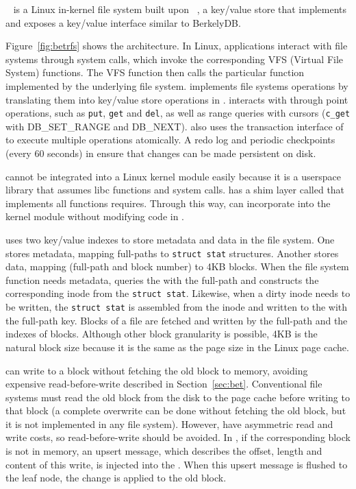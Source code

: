 \betrfs~\citep{betrfs1,betrfs1tos} is a Linux in-kernel file
system built upon \fti~\citep{fti}, a key/value store that implements \bets and
exposes a key/value interface similar to BerkelyDB.

Figure~\ref{fig:betrfs} shows the \betrfs architecture.
In Linux, applications interact with file systems through system calls,
which invoke the corresponding VFS (Virtual File System) functions.
The VFS function then calls the particular function implemented by
the underlying file system.
\betrfs implements file systems operations by translating them into key/value
store operations in \fti.
\betrfs interacts with \fti through point operations, such as \texttt{put},
\texttt{get} and \texttt{del}, as well as range queries with cursors
(\texttt{c\_get} with DB\_SET\_RANGE and DB\_NEXT).
\betrfs also uses the transaction interface of \fti to execute multiple
operations atomically.
A redo log and periodic checkpoints (every 60 seconds) in \fti ensure that
changes can be made persistent on disk.

\Fti cannot be integrated into a Linux kernel module easily because
it is a userspace library that assumes libc functions and system calls.
\betrfs has a shim layer called \klibc that implements all functions \fti
requires.
Through this way, \betrfs can incorporate \fti into the kernel module without
modifying code in \fti.

\betrfs uses two key/value indexes to store metadata and data in the file
system.
One \mdb stores metadata, mapping full-paths to \texttt{struct stat} structures.
Another \ddb stores data, mapping (full-path and block number) to 4KB blocks.
When the file system function needs metadata, \betrfs queries
the \mdb with the full-path and constructs the corresponding inode
from the \texttt{struct stat}.
Likewise, when a dirty inode needs to be written, the \texttt{struct stat} is
assembled from the inode and written to the \mdb with the
full-path key.
Blocks of a file are fetched and written by the full-path and the indexes of
blocks.
Although other block granularity is possible, 4KB is the natural block size
because it is the same as the page size in the Linux page cache.

\betrfs can write to a block without fetching the old block to memory, avoiding
expensive read-before-write described in Section~\ref{sec:bet}.
Conventional file systems must read the old block from the disk to the page
cache before writing to that block (a complete overwrite can be done without
fetching the old block, but it is not implemented in any file system).
However, \bets have asymmetric read and write costs, so read-before-write should
be avoided.
In \betrfs, if the corresponding block is not in memory, an upsert message,
which describes the offset, length and content of this write, is injected into
the \bet.
When this upsert message is flushed to the leaf node, the change is applied to
the old block.

